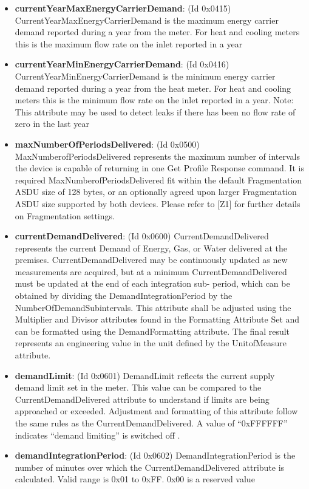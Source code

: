 \begin{itemize}
\item \textbf{currentYearMaxEnergyCarrierDemand}: (Id 0x0415) CurrentYearMaxEnergyCarrierDemand is the maximum energy carrier demand reported during a year from the meter. For heat and cooling meters this is the maximum flow rate on the inlet reported in a year
\item \textbf{currentYearMinEnergyCarrierDemand}: (Id 0x0416) CurrentYearMinEnergyCarrierDemand is the minimum energy carrier demand reported during a year from the heat meter. For heat and cooling meters this is the minimum flow rate on the inlet reported in a year. Note: This attribute may be used to detect leaks if there has been no flow rate of zero in the last year
\item \textbf{maxNumberOfPeriodsDelivered}: (Id 0x0500) MaxNumberofPeriodsDelivered represents the maximum number of intervals the device is capable of returning in one Get Profile Response command. It is required MaxNumberofPeriodsDelivered fit within the default Fragmentation ASDU size of 128 bytes, or an optionally agreed upon larger Fragmentation ASDU size supported by both devices. Please refer to [Z1] for further details on Fragmentation settings.
\item \textbf{currentDemandDelivered}: (Id 0x0600) CurrentDemandDelivered represents the current Demand of Energy, Gas, or Water delivered at the premises. CurrentDemandDelivered may be continuously updated as new measurements are acquired, but at a minimum CurrentDemandDelivered must be updated at the end of each integration sub- period, which can be obtained by dividing the DemandIntegrationPeriod by the NumberOfDemandSubintervals. This attribute shall be adjusted using the Multiplier and Divisor attributes found in the Formatting Attribute Set and can be formatted using the DemandFormatting attribute. The final result represents an engineering value in the unit defined by the UnitofMeasure attribute.
\item \textbf{demandLimit}: (Id 0x0601) DemandLimit reflects the current supply demand limit set in the meter. This value can be compared to the CurrentDemandDelivered attribute to understand if limits are being approached or exceeded. Adjustment and formatting of this attribute follow the same rules as the CurrentDemandDelivered. A value of “0xFFFFFF” indicates “demand limiting” is switched off .
\item \textbf{demandIntegrationPeriod}: (Id 0x0602) DemandIntegrationPeriod is the number of minutes over which the CurrentDemandDelivered attribute is calculated. Valid range is 0x01 to 0xFF. 0x00 is a reserved value

\end{itemize}
